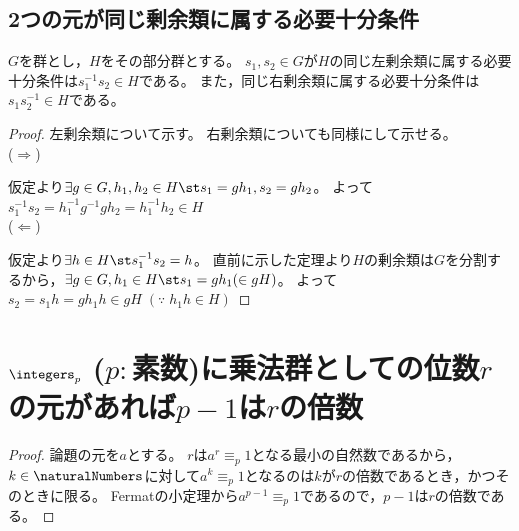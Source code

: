         \subsection{2つの元が同じ剰余類に属する必要十分条件}
            $G$を群とし，$H$をその部分群とする。
            $s_1,s_2\in G$が$H$の同じ左剰余類に属する必要十分条件は$s_1^{-1}s_2\in H$である。
            また，同じ右剰余類に属する必要十分条件は$s_1s_2^{-1}\in H$である。
            \begin{proof}
                左剰余類について示す。
                右剰余類についても同様にして示せる。\\
                ($\Rightarrow$)
                \par
                仮定より$\exists g \in G,h_1,h_2 \in H \st s_1 = gh_1,s_2 = gh_2$。
                よって$s_1^{-1}s_2 = h_1^{-1}g^{-1}gh_2 = h_1^{-1}h_2 \in H$\\
                ($\Leftarrow$)
                \par
                仮定より$\exists h \in H \st s_1^{-1}s_2 = h$。
                直前に示した定理より$H$の剰余類は$G$を分割するから，$\exists g\in G,h_1\in H \st s_1 = gh_1 (\in gH)$。
                よって$s_2 = s_1h = gh_1h \in gH\;(\because\; h_1h \in H)$
            \end{proof}
        \section{\texorpdfstring{$\integers_p$}{Zp} (\texorpdfstring{$p: $}{p: }素数)に乗法群としての位数\texorpdfstring{$r$}{r}の元があれば\texorpdfstring{$p-1$}{p-1}は\texorpdfstring{$r$}{r}の倍数}
            \begin{proof}
                論題の元を$a$とする。
                $r$は$a^r \equiv_p 1$となる最小の自然数であるから，$k\in\naturalNumbers$に対して$a^k \equiv_p 1$となるのは$k$が$r$の倍数であるとき，かつそのときに限る。
                Fermatの小定理から$a^{p-1} \equiv_p 1$であるので，$p-1$は$r$の倍数である。
            \end{proof}